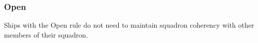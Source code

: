 \subsubsection{Open}
Ships with the Open rule do not need to maintain squadron coherency with other members of their squadron.